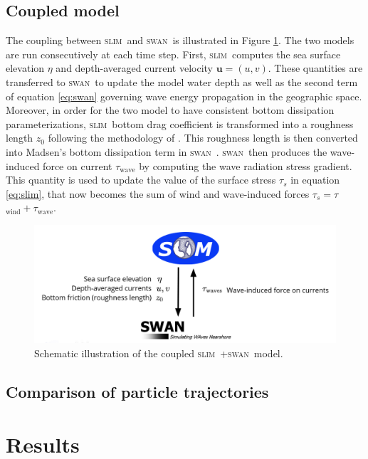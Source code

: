 \documentclass[11pt,a4paper]{article}
\newcommand{\slim}{\textsc{slim}\ }
\newcommand{\swan}{\textsc{swan}\ }
\begin{document}
\subsection{Coupled model}
The coupling between \slim and \swan is illustrated in Figure \ref{fig:coupling}. The two models are run consecutively at each time step. First, \slim computes the sea surface elevation $\eta$ and depth-averaged current velocity $\mathbf{u}=(u,v)$. These quantities are transferred to \swan to update the model water depth as well as the second term of equation \ref{eq:swan} governing wave energy propagation in the geographic space. Moreover, in order for the two model to have consistent bottom dissipation parameterizations, \slim bottom drag coefficient is transformed into a roughness length $z_0$ following the methodology of \cite{dietrich2011hurricane}. This roughness length is then converted into Madsen's bottom dissipation term in \swan. \swan then produces the wave-induced force on current {\boldmath$\tau$}$_\text{wave}$ by computing the wave radiation stress gradient. This quantity is used to update the value of the surface stress {\boldmath$\tau$}$_s$ in equation \ref{eq:slim}, that now becomes the sum of wind and wave-induced forces {\boldmath$\tau$}$_s=${\boldmath$\tau$}$_\text{wind}+${\boldmath$\tau$}$_\text{wave}$.
\begin{figure}
    \centering
    \includegraphics[width=.95\textwidth]{fig/coupling.png}
    \caption{Schematic illustration of the coupled \slim+\swan model.}
    \label{fig:coupling}
\end{figure}

\subsection{Comparison of particle trajectories}

\section{Results}
\end{document}

